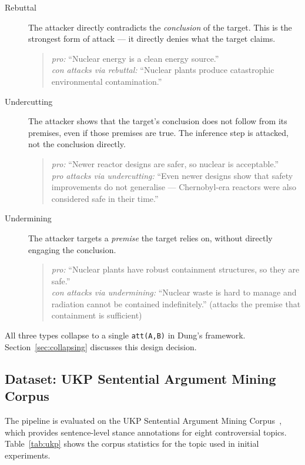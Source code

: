 \documentclass[runningheads]{llncs}
\begin{document}
\begin{description}
  \item[Rebuttal] The attacker directly contradicts the \emph{conclusion}
    of the target. This is the strongest form of attack — it directly
    denies what the target claims.
    \begin{quote}\small
      \emph{pro:} ``Nuclear energy is a clean energy source.''\\
      \emph{con attacks via rebuttal:} ``Nuclear plants produce
      catastrophic environmental contamination.''
    \end{quote}
  \item[Undercutting] The attacker shows that the target's conclusion
    does not follow from its premises, even if those premises are true.
    The inference step is attacked, not the conclusion directly.
    \begin{quote}\small
      \emph{pro:} ``Newer reactor designs are safer, so nuclear is
      acceptable.''\\
      \emph{pro attacks via undercutting:} ``Even newer designs show
      that safety improvements do not generalise — Chernobyl-era
      reactors were also considered safe in their time.''
    \end{quote}
  \item[Undermining] The attacker targets a \emph{premise} the target
    relies on, without directly engaging the conclusion.
    \begin{quote}\small
      \emph{pro:} ``Nuclear plants have robust containment structures,
      so they are safe.''\\
      \emph{con attacks via undermining:} ``Nuclear waste is hard to
      manage and radiation cannot be contained indefinitely.''
      (attacks the premise that containment is sufficient)
    \end{quote}
\end{description}

All three types collapse to a single \texttt{att(A,B)} in Dung's
framework. Section~\ref{sec:collapsing} discusses this design decision.

\subsection{Dataset: UKP Sentential Argument Mining Corpus}

The pipeline is evaluated on the UKP Sentential Argument Mining
Corpus~\cite{stab2014}, which provides sentence-level stance annotations
for eight controversial topics. Table~\ref{tab:ukp} shows the corpus
statistics for the topic used in initial experiments.
\end{document}
